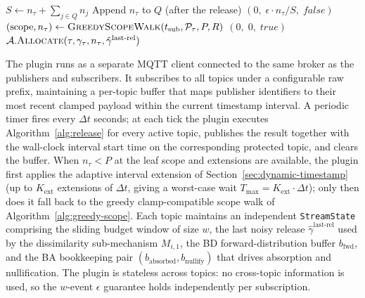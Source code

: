 \begin{algorithm*}[t]
\begin{algorithmic}[1]
  \EndIf
  \State $S \gets n_\tau + \sum_{j \in Q} n_j$ 
  \State Append $n_\tau$ to $Q$ (after the release)
  \State \Return $(0,\; \epsilon \cdot n_\tau / S,\; \textit{false})$ 
\EndProcedure
\Statex
{}
  \State $(\mathrm{scope}, n_\tau) \gets \textsc{GreedyScopeWalk}(t_{\text{sub}}, \mathcal{P}_\tau, P, R)$
    \State \Return $(0,\; 0,\; \textit{true})$ 
  \Else
    \State \Return $\mathcal{A}.\textsc{Allocate}(\tau, \gamma_\tau, n_\tau, \hat{\gamma} ^{\text{last-rel}})$
  \EndIf
\EndProcedure
\end{algorithmic}
\end{algorithm*}


The plugin runs as a separate MQTT client connected to the same broker as the publishers and subscribers. It subscribes to all topics under a configurable raw prefix, maintaining a per-topic buffer that maps publisher identifiers to their most recent clamped payload within the current timestamp interval. A periodic timer fires every $\Delta t$ seconds; at each tick the plugin executes Algorithm~\ref{alg:release} for every active topic, publishes the result together with the wall-clock interval start time on the corresponding protected topic, and clears the buffer. When $n_\tau < P$ at the leaf scope and extensions are available, the plugin first applies the adaptive interval extension of Section~\ref{sec:dynamic-timestamp} (up to $K_{\text{ext}}$ extensions of $\Delta t$, giving a worst-case wait $T_{\max} = K_{\text{ext}}\!\cdot\!\Delta t$); only then does it fall back to the greedy clamp-compatible scope walk of Algorithm~\ref{alg:greedy-scope}. Each topic maintains an independent \texttt{StreamState} comprising the sliding budget window of size $w$, the last noisy release $\hat{\gamma} ^{\text{last-rel}}$ used by the dissimilarity sub-mechanism $M_{i,1}$, the BD forward-distribution buffer $b_{\text{fwd}}$, and the BA bookkeeping pair $(b_{\mathrm{absorbed}}, b_{\text{nullify}})$ that drives absorption and nullification. The plugin is stateless across topics: no cross-topic information is used, so the $w$-event $\epsilon$ guarantee holds independently per subscription.

